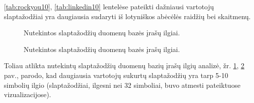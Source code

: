 \documentclass{VUMIFInfBakalaurinis}
\begin{document}
\ref{tab:rockyou10}, \ref{tab:linkedin10} lentelėse pateikti dažniausi vartotojų 
slaptažodžiai yra daugiausia sudaryti iš lotyniškos abėcėlės raidžių bei 
skaitmenų.

\begin{figure}[!ht]
  \begin{center}
  \end{center}
  \caption{
    Nutekintos slaptažodžių duomenų bazės  įrašų ilgiai.
  }
  \label{plot:rockyoulength}
\end{figure}

\begin{figure}[!ht]
  \begin{center}
  \end{center}
  \caption{
    Nutekintos slaptažodžių duomenų bazės  įrašų ilgiai.
  }
  \label{plot:myspacelength}
\end{figure}

Toliau atlikta nutekintų slaptažodžių duomenų bazių įrašų ilgių analizė, žr. 
\ref{plot:rockyoulength}, \ref{plot:myspacelength} pav., parodo, kad daugiausia 
vartotojų sukurtų slaptažodžių yra tarp 5-10 simbolių ilgio (slaptažodžiai, 
ilgesni nei 32 simboliai, buvo atmesti pateiktuose vizualizacijose).
\end{document}
